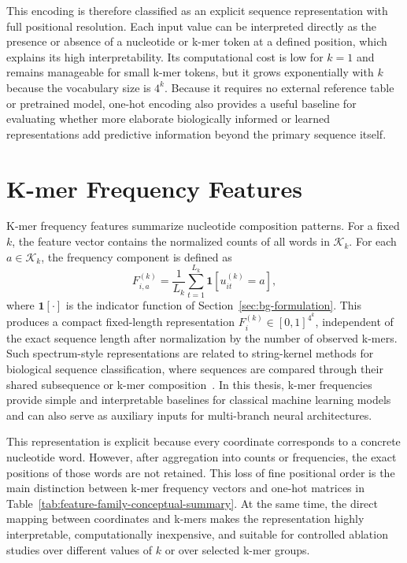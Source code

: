 This encoding is therefore classified as an explicit sequence representation with full positional resolution. Each input value can be interpreted directly as the presence or absence of a nucleotide or k-mer token at a defined position, which explains its high interpretability. Its computational cost is low for $k=1$ and remains manageable for small k-mer tokens, but it grows exponentially with $k$ because the vocabulary size is $4^k$. Because it requires no external reference table or pretrained model, one-hot encoding also provides a useful baseline for evaluating whether more elaborate biologically informed or learned representations add predictive information beyond the primary sequence itself.

\section{K-mer Frequency Features}\label{sec:features-kmer}

K-mer frequency features summarize nucleotide composition patterns. For a fixed $k$, the feature vector contains the normalized counts of all words in $\mathcal{K}_k$. For each $a\in\mathcal{K}_k$, the frequency component is defined as
\begin{equation}
F_{i,a}^{(k)}=\frac{1}{L_k}\sum_{t=1}^{L_k}\mathbf{1}\left[u_{it}^{(k)}=a\right],
\end{equation}
where $\mathbf{1}[\cdot]$ is the indicator function of Section~\ref{sec:bg-formulation}. This produces a compact fixed-length representation $F_i^{(k)}\in[0,1]^{4^k}$, independent of the exact sequence length after normalization by the number of observed k-mers. Such spectrum-style representations are related to string-kernel methods for biological sequence classification, where sequences are compared through their shared subsequence or k-mer composition~\citep{leslie2002spectrum}. In this thesis, k-mer frequencies provide simple and interpretable baselines for classical machine learning models and can also serve as auxiliary inputs for multi-branch neural architectures.

This representation is explicit because every coordinate corresponds to a concrete nucleotide word. However, after aggregation into counts or frequencies, the exact positions of those words are not retained. This loss of fine positional order is the main distinction between k-mer frequency vectors and one-hot matrices in Table~\ref{tab:feature-family-conceptual-summary}. At the same time, the direct mapping between coordinates and k-mers makes the representation highly interpretable, computationally inexpensive, and suitable for controlled ablation studies over different values of $k$ or over selected k-mer groups.

